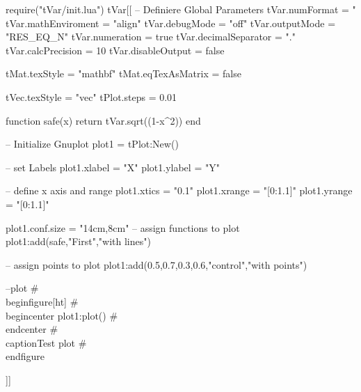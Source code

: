 \documentclass{article}
\begin{document}
 
\begin{luacode}
	require("tVar/init.lua")
tVar[[
-- Definiere Global Parameters
tVar.numFormat = "%
tVar.mathEnviroment = "align"
tVar.debugMode = "off"
tVar.outputMode = "RES_EQ_N"
tVar.numeration = true
tVar.decimalSeparator = "."
tVar.calcPrecision = 10
tVar.disableOutput = false

tMat.texStyle = "mathbf"
tMat.eqTexAsMatrix = false

tVec.texStyle = "vec"
tPlot.steps = 0.01

function safe(x)
return tVar.sqrt((1-x^2))
end

-- Initialize Gnuplot
plot1 = tPlot:New()

-- set Labels
plot1.xlabel = "X"
plot1.ylabel = "Y"

-- define x axis and range
plot1.xtics = "0.1"
plot1.xrange = "[0:1.1]"
plot1.yrange = "[0:1.1]"

plot1.conf.size = "14cm,8cm"
-- assign functions to plot
plot1:add(safe,"First","with lines")

-- assign points to plot
plot1:add({{0.5,0.7},{0.3,0.6}},"control","with points")

--plot
#\\begin{figure}[ht]
#\\begin{center}
plot1:plot()
#\\end{center}
#\\caption{Test plot}
#\\end{figure}

]]
\end{luacode}
\end{document}
